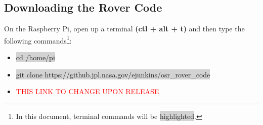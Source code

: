 \documentclass[12pt]{article}
\begin{document}
\subsection{Downloading the Rover Code}
On the Raspberry Pi, open up a terminal \textbf{(ctl + alt + t)} and then type the following commands\footnote{In this document, terminal commands will be \colorbox{lightgray}{highlighted}.}:

\begin{itemize}
	\item[] \colorbox{lightgray}{cd /home/pi}
	\item[] \colorbox{lightgray}{git clone https://github.jpl.nasa.gov/ejunkins/osr\_rover\_code}
	\item[] \textcolor{red}{THIS LINK TO CHANGE UPON RELEASE}
\end{itemize}

%
%
%
\end{document}
